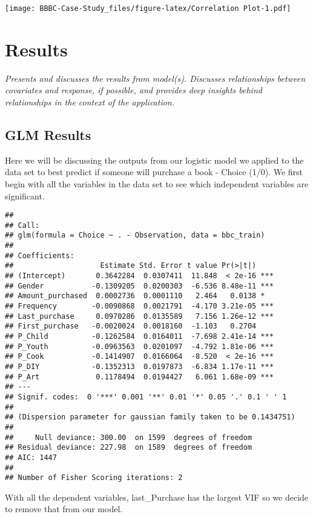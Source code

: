 \documentclass[
]{article}
\begin{document}
\texttt{[image: BBBC-Case-Study\_files/figure-latex/Correlation Plot-1.pdf]}

\hypertarget{results}{%
\section{Results}\label{results}}

\emph{Presents and discusses the results from model(s). Discusses
relationships between covariates and response, if possible, and provides
deep insights behind relationships in the context of the application.}

\hypertarget{glm-results}{%
\subsection{GLM Results}\label{glm-results}}

Here we will be discussing the outputs from our logistic model we
applied to the data set to best predict if someone will purchase a book
- Choice (1/0). We first begin with all the variables in the data set to
see which independent variables are significant.

\begin{verbatim}
## 
## Call:
## glm(formula = Choice ~ . - Observation, data = bbc_train)
## 
## Coefficients:
##                    Estimate Std. Error t value Pr(>|t|)    
## (Intercept)       0.3642284  0.0307411  11.848  < 2e-16 ***
## Gender           -0.1309205  0.0200303  -6.536 8.48e-11 ***
## Amount_purchased  0.0002736  0.0001110   2.464   0.0138 *  
## Frequency        -0.0090868  0.0021791  -4.170 3.21e-05 ***
## Last_purchase     0.0970286  0.0135589   7.156 1.26e-12 ***
## First_purchase   -0.0020024  0.0018160  -1.103   0.2704    
## P_Child          -0.1262584  0.0164011  -7.698 2.41e-14 ***
## P_Youth          -0.0963563  0.0201097  -4.792 1.81e-06 ***
## P_Cook           -0.1414907  0.0166064  -8.520  < 2e-16 ***
## P_DIY            -0.1352313  0.0197873  -6.834 1.17e-11 ***
## P_Art             0.1178494  0.0194427   6.061 1.68e-09 ***
## ---
## Signif. codes:  0 '***' 0.001 '**' 0.01 '*' 0.05 '.' 0.1 ' ' 1
## 
## (Dispersion parameter for gaussian family taken to be 0.1434751)
## 
##     Null deviance: 300.00  on 1599  degrees of freedom
## Residual deviance: 227.98  on 1589  degrees of freedom
## AIC: 1447
## 
## Number of Fisher Scoring iterations: 2
\end{verbatim}

With all the dependent variables, last\_Purchase has the largest VIF so
we decide to remove that from our model.
\end{document}
